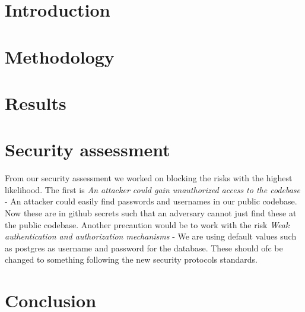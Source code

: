 \documentclass{article}
\begin{document}


\section{Introduction}

\lipsum[1]

\section{Methodology}

\lipsum[2]

\section{Results}

\lipsum[3]
\section{Security assessment}
From our security assessment we worked on blocking the risks with the highest likelihood. The first is \textit{An attacker could gain unauthorized access to the codebase}
- An attacker could easily find passwords and usernames in our public codebase. Now these are in github secrets such that an adversary cannot just 
find these at the public codebase. Another precaution would be to work with the risk \textit{Weak authentication and authorization mechanisms}
 - We are using default values such as postgres as username and password for the database. These should ofc be changed to something following the
 new security protocols standards. 


\section{Conclusion}

\lipsum[4]
\end{document}
